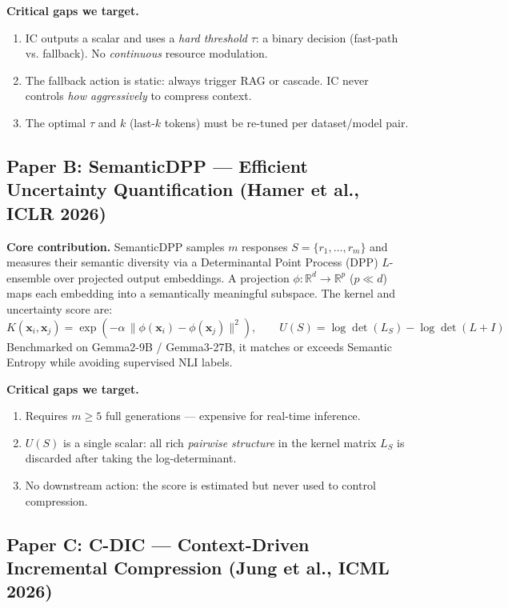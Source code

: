 \documentclass[11pt, a4paper]{article}
\newcommand{\logdet}{\log\det}
\begin{document}
\textbf{Critical gaps we target.}
\begin{enumerate}[leftmargin=*, itemsep=2pt]
  \item IC outputs a scalar and uses a \textit{hard threshold} $\tau$: a binary decision (fast-path vs. fallback). No \textit{continuous} resource modulation.
  \item The fallback action is static: always trigger RAG or cascade. IC never controls \textit{how aggressively} to compress context.
  \item The optimal $\tau$ and $k$ (last-$k$ tokens) must be re-tuned per dataset/model pair.
\end{enumerate}

\subsection{Paper B: SemanticDPP --- Efficient Uncertainty Quantification (Hamer et al., ICLR 2026)}
\label{sec:dpp}

\textbf{Core contribution.} SemanticDPP samples $m$ responses $S=\{r_1,\ldots,r_m\}$ and measures their semantic diversity via a Determinantal Point Process (DPP) $L$-ensemble over projected output embeddings. A projection $\phi:\mathbb{R}^d\to\mathbb{R}^p$ ($p\ll d$) maps each embedding into a semantically meaningful subspace. The kernel and uncertainty score are:
\begin{equation}
K(\mathbf{x}_i, \mathbf{x}_j) = \exp\!\left(-\alpha\,\|\phi(\mathbf{x}_i)-\phi(\mathbf{x}_j)\|^2\right),
\qquad
U(S) = \logdet(L_S) - \logdet(L+I)
\label{eq:dpp}
\end{equation}
Benchmarked on Gemma2-9B / Gemma3-27B, it matches or exceeds Semantic Entropy while avoiding supervised NLI labels.

\textbf{Critical gaps we target.}
\begin{enumerate}[leftmargin=*, itemsep=2pt]
  \item Requires $m \geq 5$ full generations --- expensive for real-time inference.
  \item $U(S)$ is a single scalar: all rich \emph{pairwise structure} in the kernel matrix $L_S$ is discarded after taking the log-determinant.
  \item No downstream action: the score is estimated but never used to control compression.
\end{enumerate}

\subsection{Paper C: C-DIC --- Context-Driven Incremental Compression (Jung et al., ICML 2026)}
\label{sec:cdic}
\end{document}

